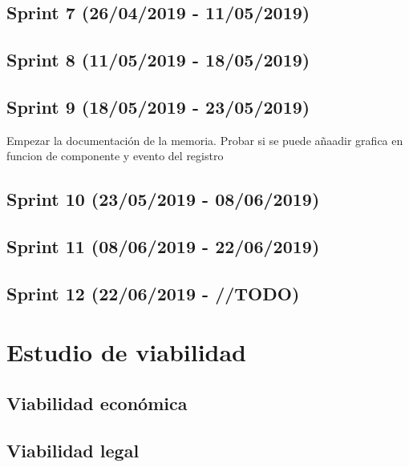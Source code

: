 \subsection{Sprint 7 (26/04/2019 - 11/05/2019)}

\subsection{Sprint 8 (11/05/2019 - 18/05/2019)}

\subsection{Sprint 9 (18/05/2019 - 23/05/2019)}
Empezar la documentación de la memoria. Probar si se puede añaadir grafica en funcion de componente y evento del registro

\subsection{Sprint 10 (23/05/2019 - 08/06/2019)}

\subsection{Sprint 11 (08/06/2019 - 22/06/2019)}

\subsection{Sprint 12 (22/06/2019 - //TODO)}


\section{Estudio de viabilidad}

\subsection{Viabilidad económica}



\subsection{Viabilidad legal}


